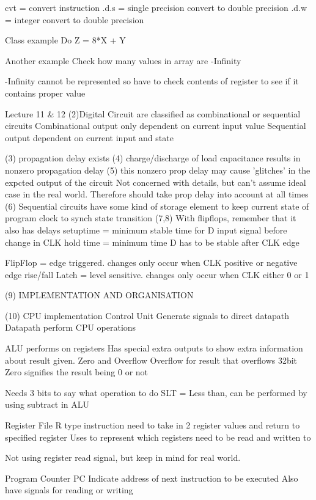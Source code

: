 \documentclass{article}
\begin{document}
	cvt = convert instruction
	.d.s = single precision convert to double precision
	.d.w = integer convert to double precision

	Class example
		Do Z = 8*X + Y

	Another example
		Check how many values in array are -Infinity

		-Infinity cannot be represented so have to check contents of register to see if it contains proper value

Lecture 11 \& 12
	(2)Digital Circuit are classified as combinational or sequential circuits
		Combinational	output only dependent on current input value
		Sequential 	output dependent on current input and state

	(3) propagation delay exists
	(4) charge/discharge of load capacitance results in nonzero propagation delay
	(5) this nonzero prop delay may cause 'glitches' in the expcted output of the circuit
		Not concerned with details, but can't assume ideal case in the real world. Therefore should take prop delay into account at all times
	(6) Sequential circuits
		have some kind of storage element to keep current state of program
		clock to synch state transition
	(7,8) With flipflops, remember that it also has delays
		setuptime = minimum stable time for D input signal before change in CLK
		hold time = minimum time D has to be stable after CLK edge

		FlipFlop = edge triggered. changes only occur when CLK positive or negative edge rise/fall
		Latch = level sensitive. changes only occur when CLK either 0 or 1

	(9) IMPLEMENTATION AND ORGANISATION

	(10) CPU implementation
		Control Unit
			Generate signals to direct datapath
		Datapath
			perform CPU operations

		ALU performs on registers
			Has special extra outputs to show extra information about result given. Zero and Overflow
			Overflow for result that overflows 32bit
			Zero signifies the result being 0 or not

			Needs 3 bits to say what operation to do
			SLT = Less than, can be performed by using subtract in ALU


		Register File
			R type instruction need to take in 2 register values and return to specified register
			Uses to represent which registers need to be read and written to

			Not using register read signal, but keep in mind for real world.

		Program Counter PC
			Indicate address of next instruction to be executed
			Also have signals for reading or writing
\end{document}
